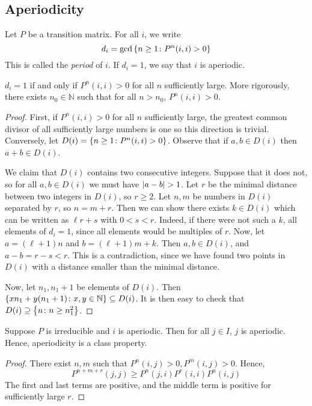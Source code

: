 \subsection{Aperiodicity}
\begin{definition}
	Let \( P \) be a transition matrix.
	For all \( i \), we write
	\[
		d_i = \gcd\qty{n \geq 1 \colon P^n(i,i) > 0}
	\]
	This is called the \textit{period} of \( i \).
	If \( d_i = 1 \), we say that \( i \) is aperiodic.
\end{definition}
\begin{lemma}
	\( d_i = 1 \) if and only if \( P^n(i,i) > 0 \) for all \( n \) sufficiently large.
	More rigorously, there exists \( n_0 \in \mathbb N \) such that for all \( n > n_0 \), \( P^n(i,i) > 0 \).
\end{lemma}
\begin{proof}
	First, if \( P^n(i,i)>0 \) for all \( n \) sufficiently large, the greatest common divisor of all sufficiently large numbers is one so this direction is trivial.
	Conversely, let \( D(i) = \qty{n \geq 1 \colon P^n(i,i) > 0} \).
	Observe that if \( a, b \in D(i) \) then \( a + b \in D(i) \).

	We claim that \( D(i) \) contains two consecutive integers.
	Suppose that it does not, so for all \( a, b \in D(i) \) we must have \( \abs{a-b} > 1 \).
	Let \( r \) be the minimal distance between two integers in \( D(i) \), so \( r \geq 2 \).
	Let \( n, m \) be numbers in \( D(i) \) separated by \( r \), so \( n = m + r \).
	Then we can show there exists \( k \in D(i) \) which can be written as \( \ell r + s \) with \( 0 < s < r \).
	Indeed, if there were not such a \( k \), all elements of \( d_i = 1 \), since all elements would be multiples of \( r \).
	Now, let \( a = (\ell + 1)n \) and \( b = (\ell+1)m + k \).
	Then \( a, b \in D(i) \), and \( a-b = r-s < r \).
	This is a contradiction, since we have found two points in \( D(i) \) with a distance smaller than the minimal distance.

	Now, let \( n_1, n_1 + 1 \) be elements of \( D(i) \).
	Then \( \qty{x n_1 + y(n_1 + 1) \colon x,y \in \mathbb N } \subseteq D(i) \).
	It is then easy to check that \( D(i) \supseteq \qty{n \colon n \geq n_1^2} \).
\end{proof}
\begin{lemma}
	Suppose \( P \) is irreducible and \( i \) is aperiodic.
	Then for all \( j \in I \), \( j \) is aperiodic.
	Hence, aperiodicity is a class property.
\end{lemma}
\begin{proof}
	There exist \( n, m \) such that \( P^n(i,j) > 0, P^m(i,j) > 0 \).
	Hence,
	\[
		P^{n+m+r}(j,j) \geq P^n(j,i) P^r(i,i) P^n(i,j)
	\]
	The first and last terms are positive, and the middle term is positive for sufficiently large \( r \).
\end{proof}

